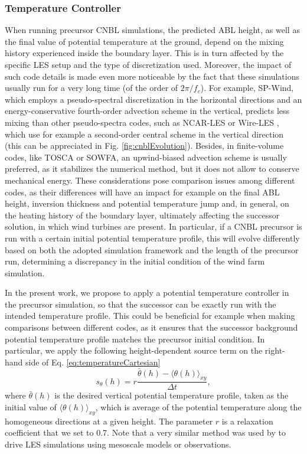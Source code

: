 \documentclass[journal abbreviation, manuscript]{copernicus}
\begin{document}
\subsubsection{Temperature Controller}
\label{subsubsec:temperatureController}
When running precursor CNBL simulations, the predicted ABL height, as well as the final value of potential temperature at the ground, depend on the mixing history experienced inside the boundary layer. This is in turn affected by the specific LES setup and the type of discretization used.  Moreover, the impact of such code details is made even more noticeable by the fact that these simulations usually run for a very long time (of the order of $2\pi/f_c$). For example, SP-Wind, which employs a pseudo-spectral discretization in the horizontal directions and an energy-conservative fourth-order advection scheme in the vertical, predicts less mixing than other pseudo-spectra codes, such as NCAR-LES \citep{2014_Pedersen} or Wire-LES \citep{2013_AbkarPortèAgel}, which use for example a second-order central scheme in the vertical direction (this can be appreciated in Fig. \ref{fig:cnblEvolution}). Besides, in finite-volume codes, like TOSCA or SOWFA, an upwind-biased advection scheme is usually preferred, as it stabilizes the numerical method, but it does not allow to conserve mechanical energy. These considerations pose comparison issues among different codes, as their differences will have an impact for example on the final ABL height, inversion thickness and potential temperature jump and, in general, on the heating history of the boundary layer, ultimately affecting the successor solution, in which wind turbines are present. In particular, if a CNBL precursor is run with a certain initial potential temperature profile, this will evolve differently based on both the adopted simulation framework and the length of the precursor run, determining a discrepancy in the initial condition of the wind farm simulation. 

In the present work, we propose to apply a potential temperature controller in the precursor simulation, so that the successor can be exactly run with the intended temperature profile. This could be beneficial for example when making comparisons between different codes, as it ensures that the successor background potential temperature profile matches the precursor initial condition. In particular, we apply the following height-dependent source term on the right-hand side of Eq. \ref{eq:temperatureCartesian}
\begin{equation}
    s_{\theta}(h) = r\frac{\bar{\theta}(h)-\langle\theta(h)\rangle_{xy}}{\Delta t}, \label{eq:temperatureControl}
\end{equation}
where $\bar{\theta}(h)$ is the desired vertical potential temperature profile, taken as the initial value of $\langle\theta(h)\rangle_{xy}$, which is average of the potential temperature along the homogeneous directions at a given height. The parameter $r$ is a relaxation coefficient that we set to 0.7. Note that a very similar method was used by \cite{2020_AllaertsEtAl, 2023_AllaertsEtAl} to drive LES simulations using mesoscale models or observations. 
\end{document}
